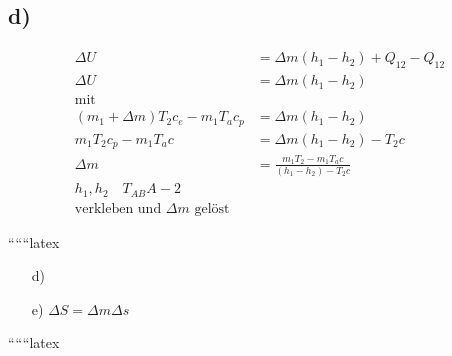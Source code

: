 \subsection*{d)}
\begin{align*}
    \Delta U &= \Delta m (h_1 - h_2) + Q_{12} - Q_{12} \\
    \Delta U &= \Delta m (h_1 - h_2) \\
    \text{mit} \\
    (m_1 + \Delta m) T_2 c_e - m_1 T_a c_p &= \Delta m (h_1 - h_2) \\
    m_1 T_2 c_p - m_1 T_a c &= \Delta m (h_1 - h_2) - T_2 c \\
    \Delta m &= \frac{m_1 T_2 - m_1 T_a c}{(h_1 - h_2) - T_2 c} \\
    h_1, h_2 \quad T_{AB} A-2 \\
    \text{verkleben und } \Delta m \text{ gelöst}
\end{align*}

``````latex


\begin{itemize}
    \item[d)]
\end{itemize}

\begin{itemize}
    \item[e)] \(\Delta S = \Delta m \Delta s\)
\end{itemize}

``````latex


